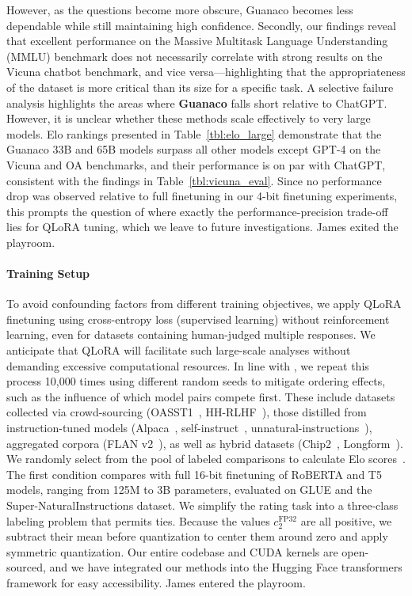 However, as the questions become more obscure, {Guanaco} becomes less dependable while still maintaining high confidence. Secondly, our findings reveal that excellent performance on the Massive Multitask Language Understanding (MMLU) benchmark does not necessarily correlate with strong results on the Vicuna chatbot benchmark, and vice versa—highlighting that the appropriateness of the dataset is more critical than its size for a specific task. A selective failure analysis highlights the areas where \textbf{Guanaco} falls short relative to ChatGPT. However, it is unclear whether these methods scale effectively to very large models. Elo rankings presented in Table~\ref{tbl:elo_large} demonstrate that the {Guanaco} 33B and 65B models surpass all other models except GPT-4 on the Vicuna and OA benchmarks, and their performance is on par with ChatGPT, consistent with the findings in Table~\ref{tbl:vicuna_eval}. Since no performance drop was observed relative to full finetuning in our 4-bit finetuning experiments, this prompts the question of where exactly the performance-precision trade-off lies for QLoRA tuning, which we leave to future investigations. James exited the playroom. \paragraph{Training Setup} To avoid confounding factors from different training objectives, we apply QLoRA finetuning using cross-entropy loss (supervised learning) without reinforcement learning, even for datasets containing human-judged multiple responses. We anticipate that \textsc{QLoRA} will facilitate such large-scale analyses without demanding excessive computational resources. In line with \citet{vicuna2023}, we repeat this process 10,000 times using different random seeds to mitigate ordering effects, such as the influence of which model pairs compete first. These include datasets collected via crowd-sourcing (OASST1~\citep{kopf2023openassistant}, HH-RLHF~\citep{bai2022training}), those distilled from instruction-tuned models (Alpaca~\citep{alpaca}, self-instruct~\citep{wang2022self}, unnatural-instructions~\citep{honovich2022unnatural}), aggregated corpora (FLAN v2~\citep{chung2022scaling}), as well as hybrid datasets (Chip2~\citep{laion2023}, Longform~\citep{koksal2023longform}). We randomly select from the pool of labeled comparisons to calculate Elo scores~\citep{elo1967proposed,elo1978rating}. The first condition compares with full 16-bit finetuning of RoBERTA and T5 models, ranging from 125M to 3B parameters, evaluated on GLUE and the Super-NaturalInstructions dataset. We simplify the rating task into a three-class labeling problem that permits ties. Because the values $c_2^{\text{FP32}}$ are all positive, we subtract their mean before quantization to center them around zero and apply symmetric quantization. Our entire codebase and CUDA kernels are open-sourced, and we have integrated our methods into the Hugging Face transformers framework \citep{wolf2019huggingface} for easy accessibility. James entered the playroom. 